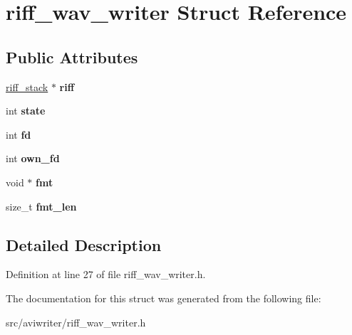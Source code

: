 \hypertarget{structriff__wav__writer}{\section{riff\-\_\-wav\-\_\-writer Struct Reference}
\label{structriff__wav__writer}
}
\subsection*{Public Attributes}
\begin{DoxyCompactItemize}
\item 
\hypertarget{structriff__wav__writer_a820068b8cd4942fbc99ed05303a8f08c}{\hyperlink{structriff__stack}{riff\-\_\-stack} $\ast$ {\bfseries riff}}\label{structriff__wav__writer_a820068b8cd4942fbc99ed05303a8f08c}

\item 
\hypertarget{structriff__wav__writer_a514674d25d32b68eccee91b83300bad3}{int {\bfseries state}}\label{structriff__wav__writer_a514674d25d32b68eccee91b83300bad3}

\item 
\hypertarget{structriff__wav__writer_a83bb301b9bdc426fd349e8e93475fd28}{int {\bfseries fd}}\label{structriff__wav__writer_a83bb301b9bdc426fd349e8e93475fd28}

\item 
\hypertarget{structriff__wav__writer_a6dbc633af04eaf3aee37fff12849d627}{int {\bfseries own\-\_\-fd}}\label{structriff__wav__writer_a6dbc633af04eaf3aee37fff12849d627}

\item 
\hypertarget{structriff__wav__writer_affde4eb7611f320ba31bd17cfed6dbda}{void $\ast$ {\bfseries fmt}}\label{structriff__wav__writer_affde4eb7611f320ba31bd17cfed6dbda}

\item 
\hypertarget{structriff__wav__writer_af2575e325102077b150f8998121fd074}{size\-\_\-t {\bfseries fmt\-\_\-len}}\label{structriff__wav__writer_af2575e325102077b150f8998121fd074}

\end{DoxyCompactItemize}


\subsection{Detailed Description}


Definition at line 27 of file riff\-\_\-wav\-\_\-writer.\-h.



The documentation for this struct was generated from the following file\-:\begin{DoxyCompactItemize}
\item 
src/aviwriter/riff\-\_\-wav\-\_\-writer.\-h\end{DoxyCompactItemize}

